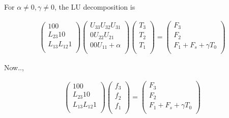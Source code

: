 For \(\alpha \neq 0, \gamma \neq 0\), the LU decomposition is

\begin{eqnarray}
  \left( \begin{array}{lll}
         1       0       0      \\
         L_{23}  1       0      \\
         L_{13}  L_{12}  1      \\
         \end{array} \right)
  \left( \begin{array}{lll}
         U_{33}  U_{32}  U_{31} \\
         0       U_{22}  U_{21} \\
         0       0       U_{11}+\alpha \\
         \end{array} \right)
  \left( \begin{array}{l}
         T_3 \\ T_2 \\ T_1 \\
         \end{array} \right)
  =
  \left(  \begin{array}{l}
          F_3 \\ F_2 \\ F_1 + F_s + \gamma T_0 \\
          \end{array} \right)
\end{eqnarray}

Now..,

\begin{eqnarray}
  \left( \begin{array}{lll}
         1       0       0      \\
         L_{23}  1       0      \\
         L_{13}  L_{12}  1      \\
         \end{array} \right)
  \left( \begin{array}{l}
         f_3 \\ f_2 \\ f_1 \\
         \end{array} \right)
  =
  \left(  \begin{array}{l}
          F_3 \\ F_2 \\ F_1 + F_s + \gamma T_0 \\
          \end{array} \right)
\end{eqnarray}

